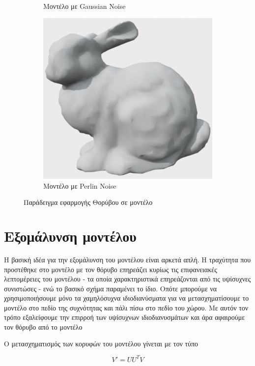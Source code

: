 \documentclass{article}
\begin{document}
\begin{figure}[h]
\begin{subfigure}{0.4\textwidth}
		\caption{Μοντέλο με Gaussian Noise}
	\end{subfigure}
	\begin{subfigure}{0.4\textwidth}
		\includegraphics[width=\textwidth]{"perlin_noise.png"}
		\caption{Μοντέλο με Perlin Noise}
	\end{subfigure}
	\caption{Παράδειγμα εφαρμογής Θορύβου σε μοντέλο}
	\label{fig:noise}
\end{figure}

\section{Εξομάλυνση μοντέλου}
\label{smoothing}
Η βασική ιδέα για την εξομάλυνση του μοντέλου είναι αρκετά απλή. Η τραχύτητα που
προστέθηκε στο μοντέλο με τον θόρυβο επηρεάζει κυρίως τις επιφανειακές λεπτομέρειες
του μοντέλου - τα οποία χαρακτηριστικά επηρεάζονται από τις υψίσυχνες συνιστώσες -
ενώ το βασικό σχήμα παραμένει το ίδιο. Οπότε μπορούμε να χρησιμοποιήσουμε μόνο τα
χαμηλόσυχνα ιδιοδιανύσματα για να μετασχηματίσουμε το μοντέλο στο πεδίο της συχνότητας και
πάλι πίσω στο πεδίο του χώρου. Με αυτόν τον τρόπο εξαλείφουμε την επιρροή των υψίσυχνων
ιδιοδιανυσμάτων και άρα αφαιρούμε τον θόρυβο από το μοντέλο

Ο μετασχηματισμός των κορυφών του μοντέλου γίνεται με τον τύπο

\[
	V' = UU^TV
\]
\end{document}
